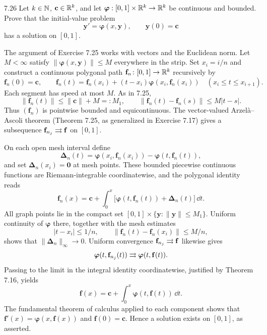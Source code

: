 \documentclass[11pt, oneside]{article}
\begin{document}
\begin{exercise}{7.26}
Let $k\in\mathbb{N}$, $\mathbf c\in\mathbb{R}^k$, and let $\boldsymbol\varphi:[0, 1]\times\mathbb{R}^k\to\mathbb{R}^k$ be continuous and bounded. Prove that the initial-value problem
\[
 \mathbf y'=\boldsymbol\varphi(x, \mathbf y), \qquad \mathbf y(0)=\mathbf c
\]
has a solution on $[0, 1]$.
\end{exercise}
\begin{solution}
The argument of Exercise 7.25 works with vectors and the Euclidean norm. Let $M<\infty$ satisfy $\|\boldsymbol\varphi(x, \mathbf y)\|\le M$ everywhere in the strip. Set $x_i=i/n$ and construct a continuous polygonal path $\mathbf f_n\colon[0, 1]\to\mathbb{R}^k$ recursively by
\[
 \mathbf f_n(0)=\mathbf c, \qquad
 \mathbf f_n(t)=\mathbf f_n(x_i)
 +(t-x_i)\boldsymbol\varphi(x_i, \mathbf f_n(x_i))
 \quad(x_i\le t\le x_{i+1}).
\]
Each segment has speed at most $M$. As in 7.25,
\[
 \|\mathbf f_n(t)\|\le\|\mathbf c\|+M=:M_1,
 \qquad \|\mathbf f_n(t)-\mathbf f_n(s)\|\le M|t-s|.
\]
Thus $(\mathbf f_n)$ is pointwise bounded and equicontinuous. The vector-valued Arzelà--Ascoli theorem (Theorem 7.25, as generalized in Exercise 7.17) gives a subsequence $\mathbf f_{n_j}\rightrightarrows\mathbf f$ on $[0, 1]$.

On each open mesh interval define
\[
 \boldsymbol\Delta_n(t)=
 \boldsymbol\varphi(x_i, \mathbf f_n(x_i))
 -\boldsymbol\varphi(t, \mathbf f_n(t)),
\]
and set $\boldsymbol\Delta_n(x_i)=\mathbf0$ at mesh points. These bounded piecewise continuous functions are Riemann-integrable coordinatewise, and the polygonal identity reads
\[
 \mathbf f_n(x)=\mathbf c+
 \int_0^x\bigl[\boldsymbol\varphi(t, \mathbf f_n(t))
 +\boldsymbol\Delta_n(t)\bigr] \,\dd t.
\]
All graph points lie in the compact set $[0, 1]\times\{\mathbf y:\|\mathbf y\|\le M_1\}$. Uniform continuity of $\boldsymbol\varphi$ there, together with the mesh estimates
\[
 |t-x_i|\le1/n, \qquad
 \|\mathbf f_n(t)-\mathbf f_n(x_i)\|\le M/n,
\]
shows that $\|\boldsymbol\Delta_n\|_\infty\to0$. Uniform convergence $\mathbf f_{n_j}\rightrightarrows\mathbf f$ likewise gives
\[
 \boldsymbol\varphi(t, \mathbf f_{n_j}(t))
 \rightrightarrows\boldsymbol\varphi(t, \mathbf f(t)).
\]
Passing to the limit in the integral identity coordinatewise, justified by Theorem 7.16, yields
\[
 \mathbf f(x)=\mathbf c+\int_0^x\boldsymbol\varphi(t, \mathbf f(t))\,\dd t.
\]
The fundamental theorem of calculus applied to each component shows that
$\mathbf f'(x)=\boldsymbol\varphi(x, \mathbf f(x))$ and $\mathbf f(0)=\mathbf c$. Hence a solution exists on $[0, 1]$, as asserted.
\end{solution}
\end{document}
